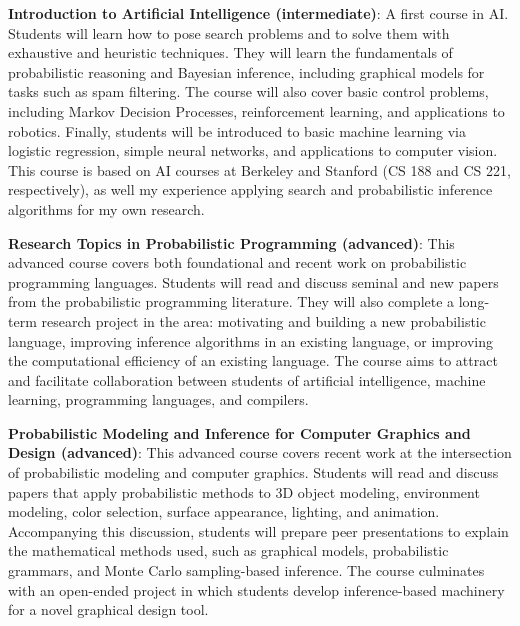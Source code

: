 \documentclass[
10pt, %
a4paper, %
oneside, %
headinclude,footinclude, %
BCOR5mm, %
]{scrartcl}
\begin{document}
\textbf{Introduction to Artificial Intelligence (intermediate)}:
A first course in AI. Students will learn how to pose search problems and to solve them with exhaustive and heuristic techniques. They will learn the fundamentals of probabilistic reasoning and Bayesian inference, including graphical models for tasks such as spam filtering. The course will also cover basic control problems, including Markov Decision Processes, reinforcement learning, and applications to robotics. Finally, students will be introduced to basic machine learning via logistic regression, simple neural networks, and applications to computer vision. This course is based on AI courses at Berkeley and Stanford (CS 188 and CS 221, respectively), as well my experience applying search and probabilistic inference algorithms for my own research.

\textbf{Research Topics in Probabilistic Programming (advanced)}:
This advanced course covers both foundational and recent work on probabilistic programming languages. Students will read and discuss seminal and new papers from the probabilistic programming literature. They will also complete a long-term research project in the area: motivating and building a new probabilistic language, improving inference algorithms in an existing language, or improving the computational efficiency of an existing language. The course aims to attract and facilitate collaboration between students of artificial intelligence, machine learning, programming languages, and compilers.

\textbf{Probabilistic Modeling and Inference for Computer Graphics and Design (advanced)}:
This advanced course covers recent work at the intersection of probabilistic modeling and computer graphics. Students will read and discuss papers that apply probabilistic methods to 3D object modeling, environment modeling, color selection, surface appearance, lighting, and animation. Accompanying this discussion, students will prepare peer presentations to explain the mathematical methods used, such as graphical models, probabilistic grammars, and Monte Carlo sampling-based inference. The course culminates with an open-ended project in which students develop inference-based machinery for a novel graphical design tool.
\end{document}
